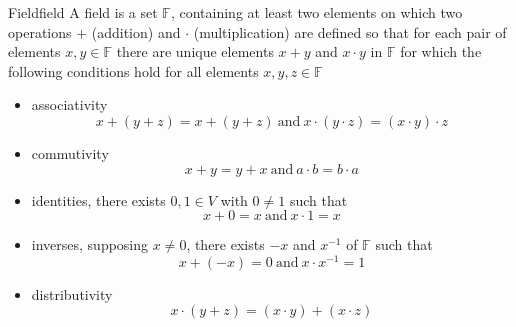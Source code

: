 \begin{definition}
{Field}{field}
A field is a set \(\mathbb{F}\), containing at least two elements on which two
operations \(+\) (addition) and \(\cdot\) (multiplication) are defined so that for
each pair of elements \(x, y \in \mathbb{F}\) there are unique elements \(x + y\)
and \(x \cdot y\) in \(\mathbb{F}\) for which the following conditions hold for all
elements \(x, y, z \in \mathbb{F}\)

\begin{itemize}
  \item associativity
  \[
  x +  \left( y +  z \right)  = x +  \left( y +  z \right)  ~\text{and}~  x
  \cdot \left( y \cdot  z \right) = \left( x \cdot y \right) \cdot z
  \]
  \item commutivity
  \[
  x +  y =  y + x ~\text{and}~ a \cdot b =  b \cdot a 
  \]
  \item identities, there exists \( 0, 1 \in  V \) with \( 0 \neq 1 \) such that
  \[
   x +  0 =  x  ~\text{and}~  x \cdot 1 =  x
  \]
  \item inverses, supposing \( x \neq 0 \), there exists \( - x \) and \( x ^{  -1 }  \) of \( \mathbb{F}
  \) such that  
  \[
  x +  \left( -  x \right) =  0 ~\text{and}~ x \cdot x ^{ -1 } = 1 
  \]
  \item distributivity
  \[
  x \cdot \left( y +  z \right) =  \left( x \cdot y \right) + \left( x \cdot z \right) 
  \]
\end{itemize}
\end{definition}
